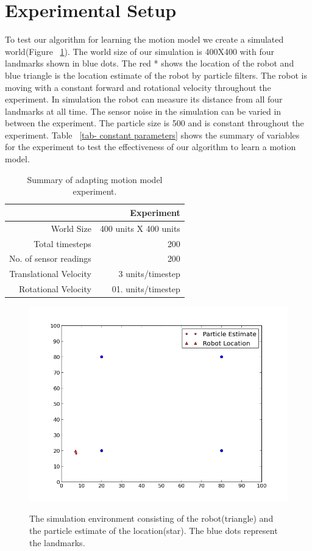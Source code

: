 \documentclass[12pt,draft]{dalcsthesis}
\begin{document}
\section{Experimental Setup}
To test our algorithm for learning the motion model we create a simulated world(Figure ~\ref{fig-: simulation world}). The world size of our simulation is 400X400 with four landmarks shown in blue dots. The red * shows the location of the robot and blue triangle is the location estimate of the  robot by particle filters. The robot is moving with a constant forward and rotational velocity throughout the experiment. In simulation the robot can measure its distance from all four landmarks at all time. The sensor noise in the simulation can be varied in between the experiment. The particle size is 500 and is constant throughout the experiment. Table ~\ref{tab- constant parameters} shows the summary of variables for the experiment to test the effectiveness of our algorithm to learn a motion model.
\begin{table}[tbh]
\centering
\begin{tabular}{|r|r|}
    \hline
    & Experiment \\
    \hline \hline
    World Size & 400 units X 400 units\\
    \hline
    Total timesteps & 200  \\
    \hline
    No. of sensor readings & 200 \\
    \hline
    Translational Velocity & 3 units/timestep \\
    \hline
    Rotational Velocity & 01. units/timestep \\
    \hline
\end{tabular}
 \caption{\label{tab-constant paramters}Summary of adapting motion model experiment.}
\end{table}

\begin{figure}
  \centering
     {\includegraphics[height = 3.0 in]{0.png}}
  \caption{\label{fig-: simulation world}The simulation environment consisting of the robot(triangle) and the particle estimate of the location(star). The blue dots represent the landmarks.}
\end{figure}
\end{document}
